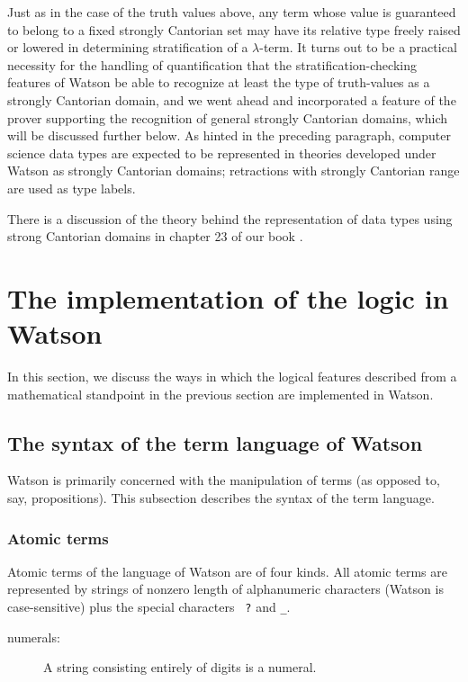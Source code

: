 \documentclass{kluwer}
\begin{document}
\begin{article}
Just as in the case of the truth values above, any term whose value is
guaranteed to belong to a fixed strongly Cantorian set may have its
relative type freely raised or lowered in determining stratification
of a $\lambda$-term.  It turns out to be a practical necessity for the
handling of quantification that the stratification-checking features
of Watson be able to recognize at least the type of truth-values as a
strongly Cantorian domain, and we went ahead and incorporated a
feature of the prover supporting the recognition of general strongly
Cantorian domains, which will be discussed further below.  As hinted
in the preceding paragraph, computer science data types are expected
to be represented in theories developed under Watson as strongly
Cantorian domains; retractions with strongly Cantorian range are
used as type labels.

There is a discussion of the theory behind the representation of
data types using strong Cantorian domains in chapter 23 of our book
\cite{textbook}.

\section{The implementation of the logic in Watson}

In this section, we discuss the ways in which the logical features
described from a mathematical standpoint in the previous section are
implemented in Watson.

\subsection{The syntax of the term language of Watson}

Watson is primarily concerned with the manipulation of terms (as
opposed to, say, propositions).  This subsection describes the syntax
of the term language.

\subsubsection{Atomic terms}

Atomic terms of the language of Watson are of four kinds.  All atomic
terms are represented by strings of nonzero length of alphanumeric
characters (Watson is case-sensitive) plus the special characters {\tt
?} and {\tt \_}.

\begin{description}

\item [numerals:]  A string consisting entirely of digits is a numeral.


\end{description}
\end{article}
\end{document}
